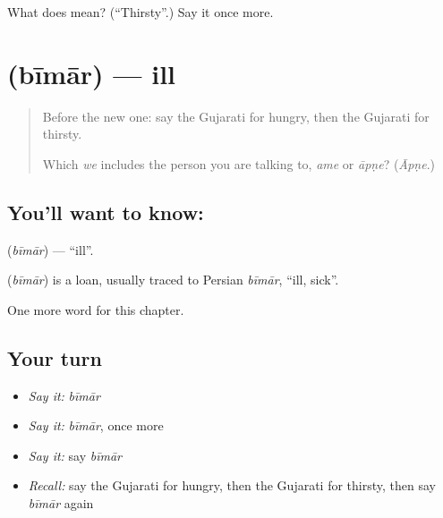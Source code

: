 \begin{tcolorbox}[breakable,colback=teal!4,colframe=teal!35!black,title={Before you move on}]
What does  mean? (\textquotedblleft{}Thirsty\textquotedblright{}.) Say it once more.
\end{tcolorbox}
\section[\texorpdfstring{\gu{બીમાર} (bīmār)}{બીમાર (bīmār)}]{ (bīmār) — ill}

\label{lesson:GU-C135-bimar}



\begin{quote}
Before the new one: say the Gujarati for hungry, then the Gujarati for thirsty.

Which \emph{we} includes the person you are talking to, \emph{ame} or \emph{āpṇe}? (\emph{Āpṇe}.)
\end{quote}

\subsection*{You'll want to know: }
\textbf{} (\emph{bīmār}) — \textquotedblleft{}ill\textquotedblright{}.

\begin{cousinweb}
\textbf{} (\emph{bīmār}) is a loan, usually traced to Persian \emph{bīmār}, \textquotedblleft{}ill, sick\textquotedblright{}.
\end{cousinweb}

\begin{grammarlens}[title={What you've built}]
One more word for this chapter.
\end{grammarlens}

\subsection*{Your turn}
\begin{itemize}
\raggedright
  \item \emph{Say it:} \emph{bīmār}
  \item \emph{Say it:} \emph{bīmār}, once more
  \item \emph{Say it:} say \emph{bīmār}
  \item \emph{Recall:} say the Gujarati for hungry, then the Gujarati for thirsty, then say \emph{bīmār} again
\end{itemize}

